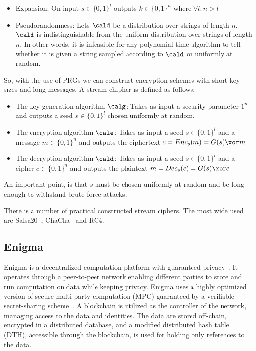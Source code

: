 \begin{itemize}
  \item Expansion: On input $s \in \{0, 1\}^{l}$ outputs $k \in \{0, 1\}^{n}$ where $\forall l: n > l$
  \item Pseudorandomness: Lets $\cald$ be a distribution over strings of length $n$. $\cald$ is indistinguishable from the uniform distribution over strings of length $n$. In other words, it is infeasible for any polynomial-time algorithm to tell whether it is given a string sampled according to $\cald$ or uniformly at random.
\end{itemize}

So, with the use of PRGs we can construct encryption schemes with short key sizes and long messages. A stream chipher is defined as follows:

\begin{itemize}
  \item The key generation algorithm $\calg$: Takes as input a security parameter $1^{n}$ and outputs a seed $s \in \{0, 1\}^{l}$ chosen uniformly at random.
  \item The encryption algorithm $\cale$: Takes as input a seed $s \in \{0, 1\}^{l}$ and a message $m \in \{0, 1\}^{n}$ and outputs the ciphertext $c = Enc_s(m) = G(s) \xor m$
  \item The decryption algorithm $\cald$: Takes as input a seed $s \in \{0, 1\}^{l}$ and a cipher $c \in \{0, 1\}^{n}$ and outputs the plaintext $m = Dec_s(c) = G(s) \xor c$
\end{itemize}

An important point, is that $s$ must be chosen uniformly at random and be long enough to withstand brute-force attacks.

There is a number of practical constructed stream ciphers. The most wide used are Salsa20~\cite{Salsa20}, ChaCha~\cite{chacha} and RC4.

\subsection{Enigma}\label{blockchain:impl:enigma}

Enigma is a decentralized computation platform with guaranteed privacy~\cite{DBLP:journals/corr/ZyskindNP15}. It operates through a peer-to-peer network enabling
different parties to store and run computation on data while keeping privacy. Enigma uses a highly optimized version of secure multi-party computation (MPC)
guaranteed by a verifiable secret-sharing scheme~\cite{DBLP:journals/corr/ZyskindNP15}. A blockchain is utilized as the controller of the network, managing access to the data and identities.
The data are stored off-chain, encrypted in a distributed database, and a modified distributed hash table (DTH), accessible through the blockchain, is used for holding only references to the data.
